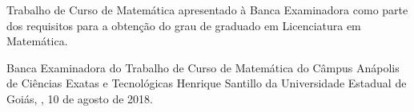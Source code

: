 \documentclass[
	12pt,				%
	openright,			%
    twoside,			%
	a4paper,			%
	english,			%
	french,				%
	spanish,			%
	brazil				%
	]{abntex2}
\numberwithin{lema}{chapter}
\numberwithin{teorema}{chapter}
\numberwithin{definicao}{chapter}
\numberwithin{figure}{chapter}
\begin{document}
%
% 
%
\begin{folhadeaprovacao}

  \begin{center}
  {\ABNTEXchapterfont\bfseries\large\imprimirtitulo}

    \vspace*{\fill}\vspace*{\fill}
    \begin{center}
    {\ABNTEXchapterfont\large\imprimirautor}
    \end{center}
    \vspace*{\fill}
    
\end{center}
\vfill  
      
   Trabalho de Curso de Matemática apresentado à Banca Examinadora como parte dos requisitos para a obtenção do grau de graduado em Licenciatura em Matemática. 
   
   Banca Examinadora do Trabalho de Curso de Matemática do Câmpus Anápolis de Ciências Exatas e Tecnológicas Henrique Santillo da Universidade Estadual de Goiás, \imprimirlocal, 10 de agosto de 2018.

\vfill

   \vfill
   \vfill
\vfill
      
  
\end{folhadeaprovacao}
\end{document}
